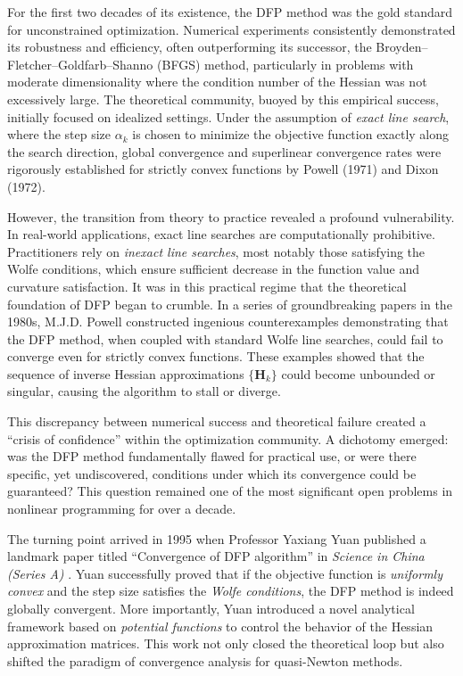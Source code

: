 \documentclass[12pt,a4paper]{article}  %
\newcounter{cite}
\theoremstyle{definition}
\numberwithin{equation}{section}
\newcommand{\HH}{\bm{H}}
\begin{document}
For the first two decades of its existence, the DFP method was the gold standard for unconstrained optimization. Numerical experiments consistently demonstrated its robustness and efficiency, often outperforming its successor, the Broyden--Fletcher--Goldfarb--Shanno (BFGS) method, particularly in problems with moderate dimensionality where the condition number of the Hessian was not excessively large. The theoretical community, buoyed by this empirical success, initially focused on idealized settings. Under the assumption of \textit{exact line search}, where the step size $\alpha_k$ is chosen to minimize the objective function exactly along the search direction, global convergence and superlinear convergence rates were rigorously established for strictly convex functions by Powell (1971) and Dixon (1972).

However, the transition from theory to practice revealed a profound vulnerability. In real-world applications, exact line searches are computationally prohibitive. Practitioners rely on \textit{inexact line searches}, most notably those satisfying the Wolfe conditions, which ensure sufficient decrease in the function value and curvature satisfaction. It was in this practical regime that the theoretical foundation of DFP began to crumble. In a series of groundbreaking papers in the 1980s, M.J.D. Powell constructed ingenious counterexamples \cite{powell1984,powell1986} demonstrating that the DFP method, when coupled with standard Wolfe line searches, could fail to converge even for strictly convex functions. These examples showed that the sequence of inverse Hessian approximations $\{\HH_k\}$ could become unbounded or singular, causing the algorithm to stall or diverge.

This discrepancy between numerical success and theoretical failure created a ``crisis of confidence'' within the optimization community. A dichotomy emerged: was the DFP method fundamentally flawed for practical use, or were there specific, yet undiscovered, conditions under which its convergence could be guaranteed? This question remained one of the most significant open problems in nonlinear programming for over a decade.

The turning point arrived in 1995 when Professor Yaxiang Yuan published a landmark paper titled ``Convergence of DFP algorithm'' in \textit{Science in China (Series A)} \cite{yuan1995}. Yuan successfully proved that if the objective function is \textit{uniformly convex} and the step size satisfies the \textit{Wolfe conditions}, the DFP method is indeed globally convergent. More importantly, Yuan introduced a novel analytical framework based on \textit{potential functions} to control the behavior of the Hessian approximation matrices. This work not only closed the theoretical loop but also shifted the paradigm of convergence analysis for quasi-Newton methods.
\end{document}
